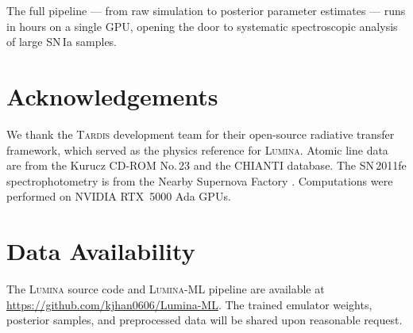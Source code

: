 \documentclass[fleqn,usenatbib]{mnras}
\newcommand{\lumina}{\textsc{Lumina}}
\newcommand{\luminaml}{\textsc{Lumina-ML}}
\newcommand{\tardis}{\textsc{Tardis}}
\begin{document}
The full pipeline --- from raw simulation to posterior parameter estimates --- runs in hours on a single GPU, opening the door to systematic spectroscopic analysis of large SN\,Ia samples.


\section*{Acknowledgements}

We thank the \tardis{} development team for their open-source radiative transfer framework, which served as the physics reference for \lumina{}. Atomic line data are from the Kurucz CD-ROM No.\,23 \citep{kurucz1995} and the CHIANTI database. The SN\,2011fe spectrophotometry is from the Nearby Supernova Factory \citep{pereira2013}. Computations were performed on NVIDIA RTX~5000 Ada GPUs.

\section*{Data Availability}

The \lumina{} source code and \luminaml{} pipeline are available at \url{https://github.com/kjhan0606/Lumina-ML}. The trained emulator weights, posterior samples, and preprocessed data will be shared upon reasonable request.





\label{lastpage}
\end{document}
